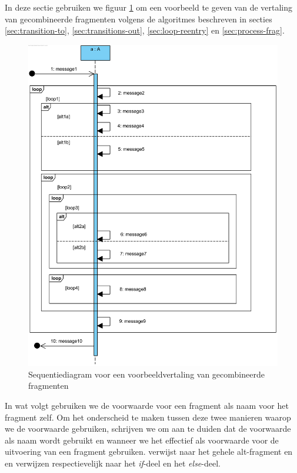 In deze sectie gebruiken we figuur \ref{fig:seq-diagram-frag-ex} om een voorbeeld te geven van de vertaling van gecombineerde fragmenten volgens de algoritmes beschreven in secties \ref{sec:transition-to}, \ref{sec:transitions-out}, \ref{sec:loop-reentry} en \ref{sec:process-frag}.

\begin{figure}
	\includegraphics[width=1\textwidth]{chap-gedrag/seq-diagram-frag-ex.png}
	\caption{Sequentiediagram voor een voorbeeldvertaling van gecombineerde fragmenten}
	\label{fig:seq-diagram-frag-ex}
\end{figure}

In wat volgt gebruiken we de voorwaarde voor een fragment als naam voor het fragment zelf. Om het onderscheid te maken tussen deze twee manieren waarop we de voorwaarde gebruiken, schrijven we  om aan te duiden dat de voorwaarde als naam wordt gebruikt en  wanneer we het effectief als voorwaarde voor de uitvoering van een fragment gebruiken.  verwijst naar het gehele alt-fragment en  en  verwijzen respectievelijk naar het \textit{if}-deel en het \textit{else}-deel.


